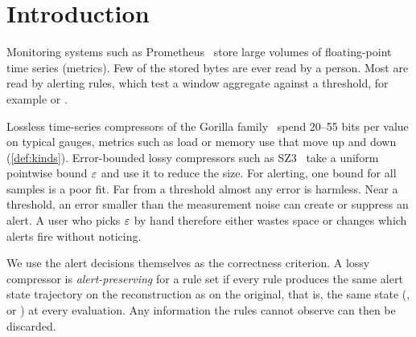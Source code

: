 \section{Introduction}
\label{sec:intro}

Monitoring systems such as Prometheus~\cite{prometheus} store large
volumes of floating-point time series (metrics). Few of the stored bytes
are ever read by a person. Most are read by alerting rules, which test a
window aggregate against a threshold, for example
 or
.

Lossless time-series compressors of the Gorilla
family~\cite{pelkonen2015gorilla} spend 20--55 bits per value on typical
gauges, metrics such as load or memory use that move up and down
(\cref{def:kinds}). Error-bounded lossy compressors such as
SZ3~\cite{liang2023sz3} take a uniform pointwise bound $\varepsilon$ and use it to
reduce the size. For alerting, one bound for all samples is a poor fit.
Far from a threshold almost any error is harmless. Near a threshold, an
error smaller than the measurement noise can create or suppress an alert.
A user who picks $\varepsilon$ by hand therefore either wastes space or changes
which alerts fire without noticing.

We use the alert decisions themselves as the correctness criterion. A lossy
compressor is \emph{alert-preserving} for a rule set if every rule produces
the same alert state trajectory on the reconstruction as on the original,
that is, the same state (,  or )
at every evaluation. Any information the rules cannot observe can then be
discarded.

